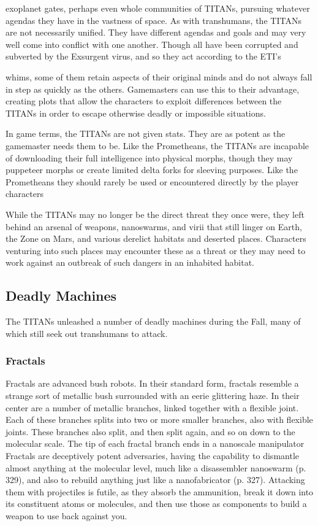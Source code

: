 exoplanet gates, perhaps even whole communities of TITANs, pursuing whatever agendas they have in the vastness of space. As with transhumans, the TITANs are not necessarily unified. They have different agendas and goals and may very well come into conflict with one another. Though all have been corrupted and subverted by the Exsurgent virus, and so they act according to the ETI's 

whims, some of them retain aspects of their original minds and do not always fall in step as quickly as the others. Gamemasters can use this to their advantage, creating plots that allow the characters to exploit differences between the TITANs in order to escape otherwise deadly or impossible situations. 

In game terms, the TITANs are not given stats. They are as potent as the gamemaster needs them to be. Like the Prometheans, the TITANs are incapable of downloading their full intelligence into physical morphs, though they may puppeteer morphs or create limited delta forks for sleeving purposes. Like the Prometheans they should rarely be used or encountered directly by the player characters 

While the TITANs may no longer be the direct threat they once were, they left behind an arsenal of weapons, nanoswarms, and virii that still linger on Earth, the Zone on Mars, and various derelict habitats and deserted places. Characters venturing into such places may encounter these as a threat or they may need to work against an outbreak of such dangers in an inhabited habitat. 

\subsection{Deadly Machines} 

The TITANs unleashed a number of deadly machines during the Fall, many of which still seek out transhumans to attack. 

\subsubsection{Fractals } 

Fractals are advanced bush robots. In their standard form, fractals resemble a strange sort of metallic bush surrounded with an eerie glittering haze. In their center are a number of metallic branches, linked together with a flexible joint. Each of these branches splits into two or more smaller branches, also with flexible joints. These branches also split, and then split again, and so on down to the molecular scale. The tip of each fractal branch ends in a nanoscale manipulator Fractals are deceptively potent adversaries, having the capability to dismantle almost anything at the molecular level, much like a disassembler nanoswarm (p. 329), and also to rebuild anything just like a nanofabricator (p. 327). Attacking them with projectiles is futile, as they absorb the ammunition, break it down into its constituent atoms or molecules, and then use those as components to build a weapon to use back against you. 

